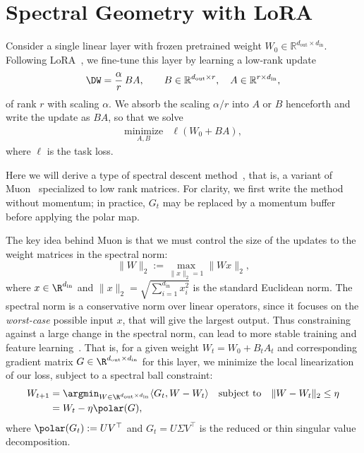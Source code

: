 \section{Spectral Geometry with LoRA}
\label{sec:setup}



Consider a single linear layer with frozen pretrained weight
$
W_0 \in \mathbb{R}^{d_{\mathrm{out}} \times d_{\mathrm{in}}}.
$
Following LoRA~\cite{lora}, we fine-tune this layer by learning a low-rank update
\begin{equation}
\DW = \frac{\alpha}{r}\,BA, \qquad
B \in \mathbb{R}^{d_{\mathrm{out}} \times r}, \quad
A \in \mathbb{R}^{r \times d_{\mathrm{in}}},
\label{eq:lora}
\end{equation}
of rank \(r\) with scaling \(\alpha\). We absorb the scaling \(\alpha/r\) into \(A\) or \(B\) henceforth and write the update as \(BA\), so that we solve
\[
\begin{array}{ll}
\underset{A, B}{\mbox{minimize}}&
\ell(W_0 + BA),
\end{array}
\]
where \(\ell\) is the task loss.


Here we will derive a type of spectral descent method~\cite{carlson2015preconditioned, carlson2015stochastic}, that is, a variant of Muon~\cite{muon} specialized to low rank matrices. 
For clarity, we first write the method without momentum; in practice, \(G_t\) may be replaced by a momentum buffer before applying the polar map.

The key idea behind Muon is that we must control the size of the updates to the weight matrices in the spectral norm:
\[ 
\|W\|_2 := \max_{\|x\|_2 =1} \|W x \|_2,
\]
where $x\in \R^{d_{\mathrm{in}}}$ and $\|x\|_2 = \sqrt{\sum_{i=1}^{d_{\mathrm{in}}} x_i^2}$ is the standard Euclidean norm.
The spectral norm is a conservative norm over linear operators, since it focuses on the \emph{worst-case} possible input $x$, that will give the largest output. Thus constraining against a large change in the spectral norm, can lead to more stable training and feature learning~\cite{yang2023spectral,bernstein2025modular}.
That is, for a given weight $W_t = W_0 + B_tA_t$ and corresponding  gradient matrix $G \in \R^{d_{\mathrm{out}} \times d_{\mathrm{in}}}$ for this layer, we minimize the local linearization of our loss, subject to a spectral ball constraint:
\begin{align} \label{eq:muon}
    W_{t+1} &= \argmin_{W\in  \R^{d_{\mathrm{out}} \times d_{\mathrm{in}}}} \langle G_t,W-W_t\rangle \quad \mbox{subject to}\quad  \| W-W_t\|_2 \leq \eta \\
    &= W_t - \eta \polar(G), \label{lem:lmo} 
\end{align} 
where  $\polar(G_t) := U V^\top$ and 
$
G_t = U \Sigma V^\top
$
is the reduced or thin singular value decomposition.

